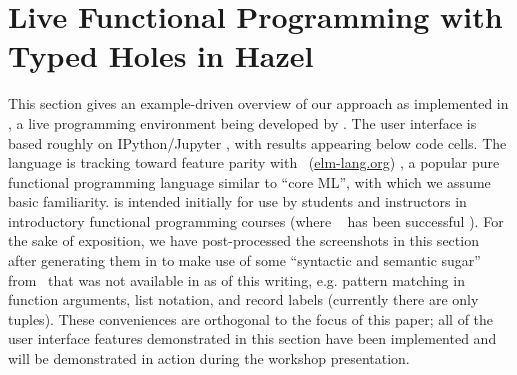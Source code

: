 \newcommand{\examplesSec}{Live Functional Programming with Typed Holes in Hazel}
\section{\examplesSec} %
\label{sec:examples}

\newcommand{\overviewExample}[2]{\paragraph{Example {#1}: {#2}}}

This section gives an example-driven overview of our approach as implemented in  \Hazel, a live programming environment being developed by \citet{HazelnutSNAPL}. The \Hazel user interface is based roughly on IPython/Jupyter \cite{PER-GRA:2007}, with results appearing below code cells. 
The \Hazel language is tracking toward feature parity with \Elm~(\url{elm-lang.org}) \cite{czaplicki2012elm,Elm}, a popular pure functional programming language similar to ``core ML'', with which we assume basic familiarity. 
\Hazel is intended initially for use by students and instructors in introductory functional programming courses (where \Elm~ has been successful \cite{DBLP:journals/corr/abs-1805-05125}). 
For the sake of 
exposition, we have post-processed the screenshots in this section after generating them in \Hazel to make use of some ``syntactic and semantic sugar'' from \Elm~that was not available in \Hazel as of this writing, e.g. pattern matching in function arguments, list  notation, and record labels (currently there are only tuples). These conveniences are orthogonal to the focus of this paper; all of the user interface features demonstrated in this section have been implemented and will be demonstrated in action during the workshop presentation.



% 
% 


